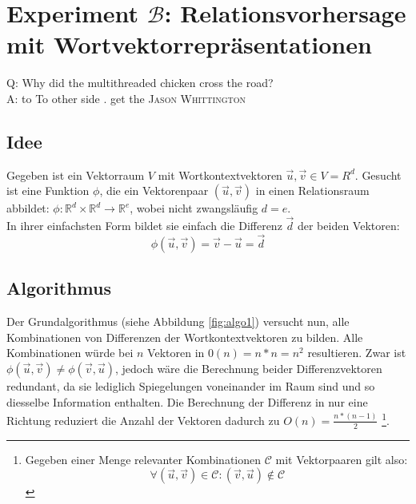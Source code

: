 
\chapter{Experiment $\mathcal{B}$: Relationsvorhersage mit Wortvektorrepräsentationen} %

\label{Chapter7} %


\begin{itquote}
Q: Why did the multithreaded chicken cross the road?\\
A: to To other side . get the
\flushright
\textsc{Jason Whittington}
\end{itquote}

\section{Idee}

Gegeben ist ein Vektorraum $V$ mit Wortkontextvektoren $\vec{u}, \vec{v} \in V = {R}^d$.
Gesucht ist eine Funktion $\phi$, die ein Vektorenpaar $(\vec{u}, \vec{v})$ in einen Relationsraum abbildet:
$\phi: \mathbb{R}^d \times \mathbb{R}^d \to \mathbb{R}^e$, wobei
nicht zwangsläufig $d = e$.\\
In ihrer einfachsten Form bildet sie einfach die Differenz $\vec{d}$ der beiden Vektoren:
\begin{equation}
  \phi(\vec{u}, \vec{v}) = \vec{v} - \vec{u} = \vec{d}
\end{equation}

\section{Algorithmus}

Der Grundalgorithmus (siehe Abbildung \ref{fig:algo1}) versucht nun, alle Kombinationen von Differenzen der
Wortkontextvektoren zu bilden. Alle Kombinationen würde bei $n$ Vektoren in $0(n) = n * n = n^2$ resultieren.
Zwar ist $\phi(\vec{u}, \vec{v}) \neq \phi(\vec{v}, \vec{u})$, jedoch wäre die Berechnung beider Differenzvektoren redundant,
da sie lediglich Spiegelungen voneinander im Raum sind und so diesselbe Information enthalten. Die Berechnung
der Differenz in nur eine Richtung reduziert die Anzahl der Vektoren dadurch zu $O(n) = \frac{n * (n-1)}{2}$
\footnote{
Gegeben einer Menge relevanter Kombinationen $\mathcal{C}$ mit Vektorpaaren gilt also:
\[
  \forall (\vec{u}, \vec{v}) \in \mathcal{C}: (\vec{v}, \vec{u}) \notin \mathcal{C}
\]
}.

